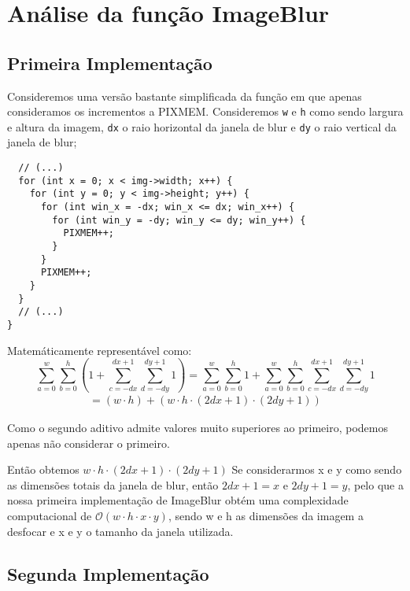 \chapter{Análise da função ImageBlur}

\section{Primeira Implementação}
Consideremos uma versão bastante simplificada da função em que apenas consideramos os incrementos a PIXMEM. Consideremos
\verb|w| e \verb|h| como sendo largura e altura da imagem,
\verb|dx| o raio horizontal da janela de blur e \verb|dy| o
raio vertical da janela de blur;
\begin{listing}[H]
\begin{verbatim}
  // (...) 
  for (int x = 0; x < img->width; x++) {
    for (int y = 0; y < img->height; y++) {
      for (int win_x = -dx; win_x <= dx; win_x++) {
        for (int win_y = -dy; win_y <= dy; win_y++) {
          PIXMEM++;
        }
      }
      PIXMEM++;
    }
  }
  // (...)
}
\end{verbatim}
\end{listing}

Matemáticamente representável como:
\\
\begin{equation}
  \sum_{a=0}^{w}\sum_{b=0}^{h} (1 + \sum_{c=-dx}^{dx+1}\sum_{d=-dy}^{dy+1} 1) 
   = \sum_{a=0}^{w}\sum_{b=0}^{h} 1 +
  \sum_{a=0}^{w}\sum_{b=0}^{h} 
 \sum_{c=-dx}^{dx+1}\sum_{d=-dy}^{dy+1} 1
\end{equation}
\begin{align*}
 = (w \cdot h) + (w \cdot h \cdot (2dx + 1) \cdot (2dy + 1))
\end{align*}

Como o segundo aditivo admite valores muito superiores ao
primeiro, podemos apenas não considerar o primeiro.

Então obtemos $w\cdot h \cdot (2dx + 1) \cdot (2dy + 1)$
Se considerarmos x e y como sendo as dimensões totais da
janela de blur, então $2dx + 1 = x$ e $2dy + 1 = y$,
pelo que a nossa primeira implementação de ImageBlur obtém
uma complexidade computacional de $\mathcal{O}(w\cdot h\cdot
x\cdot y)$, sendo w e h as dimensões da imagem a desfocar e
x e y o tamanho da janela utilizada.



\section{Segunda Implementação}
